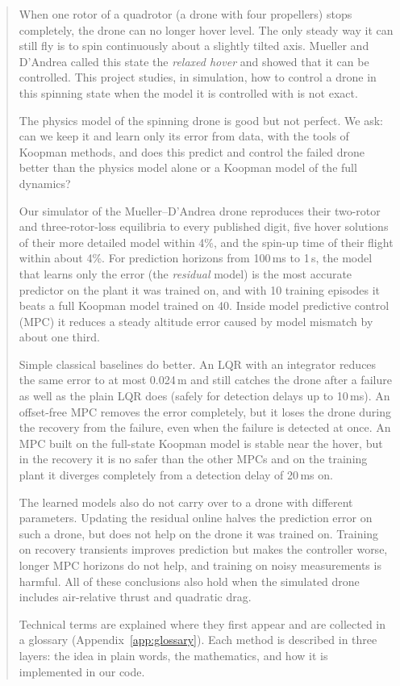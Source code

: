 \begin{abstract}
When one rotor of a quadrotor (a drone with four propellers) stops completely, the drone can no longer hover level. The only steady way it can still fly is to spin continuously about a slightly tilted axis. Mueller and D'Andrea called this state the \emph{relaxed hover} and showed that it can be controlled. This project studies, in simulation, how to control a drone in this spinning state when the model it is controlled with is not exact.

The physics model of the spinning drone is good but not perfect. We ask: can we keep it and learn only its error from data, with the tools of Koopman methods, and does this predict and control the failed drone better than the physics model alone or a Koopman model of the full dynamics?

Our simulator of the Mueller--D'Andrea drone reproduces their two-rotor and three-rotor-loss equilibria to every published digit, five hover solutions of their more detailed model within 4\%, and the spin-up time of their flight within about 4\%. For prediction horizons from 100\,ms to 1\,s, the model that learns only the error (the \emph{residual} model) is the most accurate predictor on the plant it was trained on, and with 10 training episodes it beats a full Koopman model trained on 40. Inside model predictive control (MPC) it reduces a steady altitude error caused by model mismatch by about one third.

Simple classical baselines do better. An LQR with an integrator reduces the same error to at most 0.024\,m and still catches the drone after a failure as well as the plain LQR does (safely for detection delays up to 10\,ms). An offset-free MPC removes the error completely, but it loses the drone during the recovery from the failure, even when the failure is detected at once. An MPC built on the full-state Koopman model is stable near the hover, but in the recovery it is no safer than the other MPCs and on the training plant it diverges completely from a detection delay of 20\,ms on.

The learned models also do not carry over to a drone with different parameters. Updating the residual online halves the prediction error on such a drone, but does not help on the drone it was trained on. Training on recovery transients improves prediction but makes the controller worse, longer MPC horizons do not help, and training on noisy measurements is harmful. All of these conclusions also hold when the simulated drone includes air-relative thrust and quadratic drag.

Technical terms are explained where they first appear and are collected in a glossary (Appendix~\ref{app:glossary}). Each method is described in three layers: the idea in plain words, the mathematics, and how it is implemented in our code.
\end{abstract}
